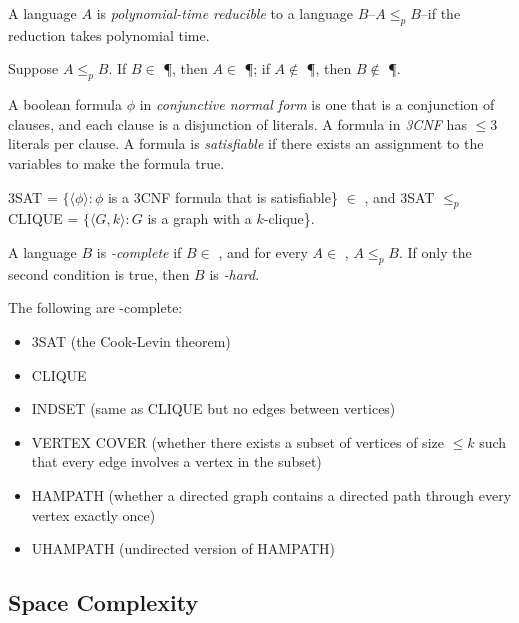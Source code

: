 \begin{definition}
A language $A$ is \emph{polynomial-time reducible} to a language $B$--$A \le_p B$--if the reduction takes polynomial time.
\end{definition}

\begin{theorem}
Suppose $A \le_p B$. If $B \in$ \P, then $A \in$ \P; if $A \notin$ \P, then $B \notin$ \P.
\end{theorem}

\begin{definition}
A boolean formula $\phi$ in \emph{conjunctive normal form} is one that is a conjunction of clauses, and each clause is a disjunction of literals. A formula in \emph{3CNF} has $\le 3$ literals per clause. A formula is \emph{satisfiable} if there exists an assignment to the variables to make the formula true.
\end{definition}

\begin{theorem}
3SAT = $\{\langle \phi \rangle : \phi$ is a 3CNF formula that is satisfiable\} $\in$ \NP, and 3SAT $\le_p$ CLIQUE = $\{\langle G, k\rangle : G$ is a graph with a $k$-clique\}.
\end{theorem}

\begin{definition}
A language $B$ is \emph{\NP-complete} if $B \in$ \NP, and for every $A \in$ \NP, $A \le_p B$. If only the second condition is true, then $B$ is \emph{\NP-hard}.
\end{definition}

\begin{theorem}
The following are \NP-complete:
\begin{itemize}
\item 3SAT (the Cook-Levin theorem)
\item CLIQUE
\item INDSET (same as CLIQUE but no edges between vertices)
\item VERTEX COVER (whether there exists a subset of vertices of size $\le k$ such that every edge involves a vertex in the subset)
\item HAMPATH (whether a directed graph contains a directed path through every vertex exactly once)
\item UHAMPATH (undirected version of HAMPATH)
\end{itemize}
\end{theorem}

\subsection{Space Complexity}

